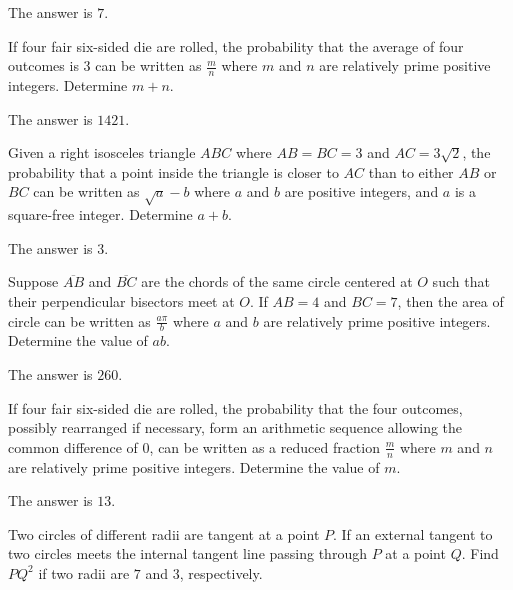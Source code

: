 \begin{solution}
The answer is $7$.
\end{solution}

\begin{problem}
If four fair six-sided die are rolled, the probability that the average of four outcomes is $3$ can be written as $\frac{m}{n}$ where $m$ and $n$ are relatively prime positive integers. Determine $m+n$.
\end{problem}

\begin{solution}
The answer is $1421$.
\end{solution}

\begin{problem}
Given a right isosceles triangle $ABC$ where $AB=BC=3$ and $AC=3\sqrt{2}$, the probability that a point inside the triangle is closer to $AC$ than to either $AB$ or $BC$ can be written as $\sqrt{a}-b$ where $a$ and $b$ are positive integers, and $a$ is a square-free integer. Determine $a+b$.
\end{problem}

\begin{solution}
The answer is $3$.
\end{solution}

\begin{problem}
Suppose $\overline{AB}$ and $\overline{BC}$ are the chords of the same circle centered at $O$ such that their perpendicular bisectors meet at $O$. If $AB=4$ and $BC=7$, then the area of circle can be written as $\frac{a\pi}{b}$ where $a$ and $b$ are relatively prime positive integers. Determine the value of $ab$.
\end{problem}

\begin{solution}
The answer is $260$.
\end{solution}

\begin{problem}
If four fair six-sided die are rolled, the probability that the four outcomes, possibly rearranged if necessary, form an arithmetic sequence allowing the common difference of $0$, can be written as a reduced fraction $\frac{m}{n}$ where $m$ and $n$ are relatively prime positive integers. Determine the value of $m$.
\end{problem}

\begin{solution}
The answer is $13$.
\end{solution}

\begin{problem}
Two circles of different radii are tangent at a point $P$. If an external tangent to two circles meets the internal tangent line passing through $P$ at a point $Q$. Find $PQ^2$ if two radii are $7$ and $3$, respectively.
\end{problem}

